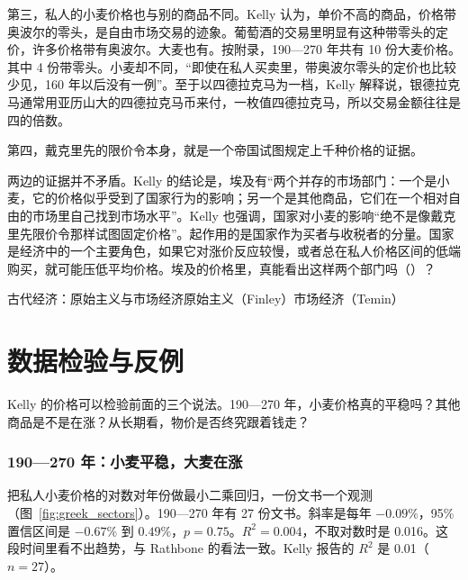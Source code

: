 第三，私人的小麦价格也与别的商品不同。Kelly 认为，单价不高的商品，价格带奥波尔的零头，是自由市场交易的迹象。葡萄酒的交易里明显有这种带零头的定价，许多价格带有奥波尔。大麦也有。按附录，190—270 年共有 10 份大麦价格。其中 4 份带零头。小麦却不同，“即使在私人买卖里，带奥波尔零头的定价也比较少见，160 年以后没有一例”\cite{kelly2021}。至于以四德拉克马为一档，Kelly 解释说，银德拉克马通常用亚历山大的四德拉克马币来付，一枚值四德拉克马，所以交易金额往往是四的倍数\cite{kelly2021}。

第四，戴克里先的限价令本身，就是一个帝国试图规定上千种价格的证据。

两边的证据并不矛盾。Kelly 的结论是，埃及有“两个并存的市场部门：一个是小麦，它的价格似乎受到了国家行为的影响；另一个是其他商品，它们在一个相对自由的市场里自己找到市场水平”\cite{kelly2021}。Kelly 也强调，国家对小麦的影响“绝不是像戴克里先限价令那样试图固定价格”\cite{kelly2021}。起作用的是国家作为买者与收税者的分量。国家是经济中的一个主要角色，如果它对涨价反应较慢，或者总在私人价格区间的低端购买，就可能压低平均价格\cite{kelly2021}。埃及的价格里，真能看出这样两个部门吗（）？

\begin{compare}{古代经济：原始主义与市场经济}{原始主义（Finley）}{市场经济（Temin）}
\end{compare}

\section{数据检验与反例}\label{sec:greek-test}

Kelly 的价格可以检验前面的三个说法。190—270 年，小麦价格真的平稳吗？其他商品是不是在涨？从长期看，物价是否终究跟着钱走？

\subsubsection{190—270 年：小麦平稳，大麦在涨}
把私人小麦价格的对数对年份做最小二乘回归，一份文书一个观测（图~\ref{fig:greek_sectors}）。190—270 年有 27 份文书。斜率是每年 $-0.09\%$，95\% 置信区间是 $-0.67\%$ 到 $0.49\%$，$p=0.75$。$R^{2}=0.004$，不取对数时是 0.016。这段时间里看不出趋势，与 Rathbone 的看法一致。Kelly 报告的 $R^{2}$ 是 0.01（$n=27$）\cite{kelly2021}。

